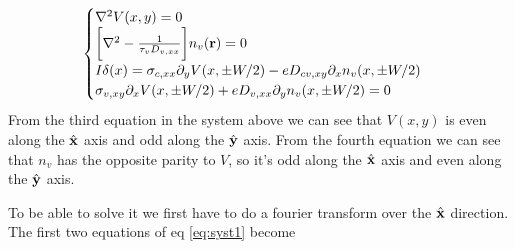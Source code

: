\begin{equation}
    \begin{cases}
        \nabla^2 V(x,y)=0\\
        \bigg[\nabla^2 -\frac 1{\tau_v D_{v,xx}}\bigg]n_v(\mathbf{r})=0\\
        I\delta(x)=\sigma_{c,xx}\partial_y V(x,\pm W/2)-eD_{cv,xy}\partial_x n_v(x,\pm W/2)\\
        \sigma_{v,xy}\partial_x V(x,\pm W/2)+eD_{v,xx}\partial_y n_v(x,\pm W/2)=0
    \end{cases}
    \label{eq:syst1}
\end{equation}
From the third equation in the system above we can see that $V(x,y)$ is even along the $\hat{\mathbf{x}}$ axis and odd along the $\hat{\mathbf{y}}$ axis.\newline
From the fourth equation we can see that $n_v$ has the opposite parity to $V$, so it's odd along the $\hat{\mathbf{x}}$ axis and even along the $\hat{\mathbf{y}}$ axis.\newline

To be able to solve it we first have to do a fourier transform over the $\hat{\mathbf{x}}$ direction. The first two equations of eq \ref{eq:syst1} become 


